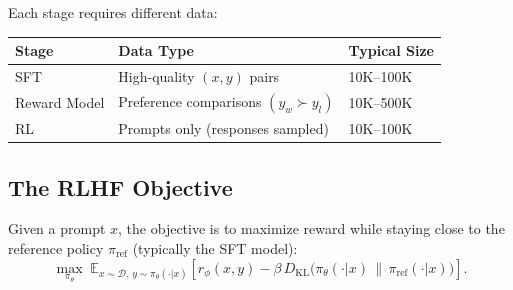 \begin{remark}
    Each stage requires different data:
    \begin{center}
        \begin{tabular}{l|l|l}
            \textbf{Stage} & \textbf{Data Type}                       & \textbf{Typical Size} \\
            \hline
            SFT            & High-quality $(x, y)$ pairs              & 10K--100K             \\
            Reward Model   & Preference comparisons $(y_w \succ y_l)$ & 10K--500K             \\
            RL             & Prompts only (responses sampled)         & 10K--100K             \\
        \end{tabular}
    \end{center}
\end{remark}

\subsection{The RLHF Objective}

\begin{definition}
    Given a prompt $x$, the objective is to maximize reward while staying close to the reference policy $\pi_{\text{ref}}$ (typically the SFT model):
    \[
        \max_{\pi_\theta} \; \mathbb{E}_{x \sim \mathcal{D}, \, y \sim \pi_\theta(\cdot|x)} \left[ r_\phi(x, y) - \beta \, D_{\mathrm{KL}}\bigl(\pi_\theta(\cdot|x) \,\|\, \pi_{\text{ref}}(\cdot|x)\bigr) \right].
    \]
\end{definition}

